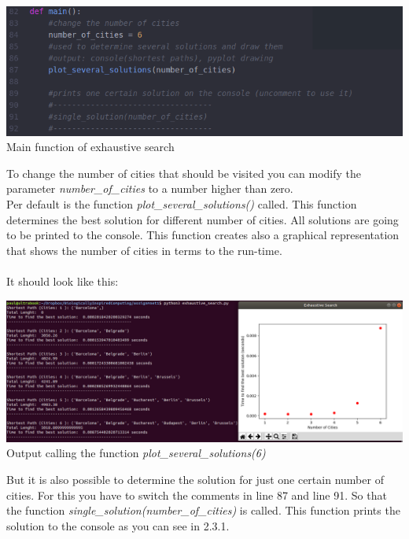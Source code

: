 \documentclass[10pt,a4paper]{article}
\begin{document}
	\begin{center}
		\includegraphics[width=1.0\linewidth]{pictures/exhaustiveSearch/use_the_program}
		\\
		Main function of exhaustive search
		\\
	\end{center}
	To change the number of cities that should be visited you can modify the parameter \textit{number\_of\_cities} to a number higher than zero.
	\\
	Per default is the function \textit{plot\_several\_solutions()} called. This function determines the best solution for different number of cities. All solutions are going to be printed to the console. This function creates also a graphical representation that shows the number of cities in terms to the run-time.
	\\
	\\
	It should look like this: 
	\begin{center}
		\includegraphics[width=1.0\linewidth]{pictures/exhaustiveSearch/plot_time_increasing}
		\\
		Output calling the function \textit{plot\_several\_solutions(6)}
		\\
	\end{center}
	But it is also possible to determine the solution for just one certain number of cities. For this you have to switch the comments in line 87 and line 91. So that the function \textit{single\_solution(number\_of\_cities)} is called. This function prints the solution to the console as you can see in 2.3.1.
\end{document}
